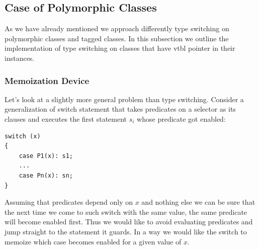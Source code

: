 \documentclass[preprint]{sigplanconf}
\makeatletter
\DeclareRobustCommand{\code}[1]{{\lstinline[breaklines=false,escapechar=@]{#1}}}
\makeatother
\begin{document}
%

\subsection{Case of Polymorphic Classes}
\label{sec:copc}

As we have already mentioned we approach differently type switching on 
polymorphic classes and tagged classes. In this subsection we outline the 
implementation of type switching on classes that have vtbl pointer in their 
instances.


\subsubsection{Memoization Device}
\label{sec:memdev}

Let's look at a slightly more general problem than type switching. Consider a 
generalization of switch statement that takes predicates on a selector as its 
clauses and executes the first statement $s_i$ whose predicate got enabled: 

\begin{lstlisting}
switch (x)
{
    case P1(x): s1;
    ...
    case Pn(x): sn;
}
\end{lstlisting}

\noindent
Assuming that predicates depend only on $x$ and nothing else we can be sure that
the next time we come to such switch with the same value, the same predicate 
will become enabled first. Thus we would like to avoid evaluating predicates and 
jump straight to the statement it guards. In a way we would like the switch to 
memoize which case becomes enabled for a given value of $x$. 
\end{document}
